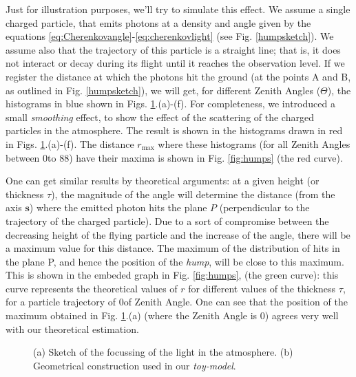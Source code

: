 Just for illustration purposes, we'll try to simulate this effect. We
assume a single charged particle, that emits \Cherenkov photons at a
density and angle given by the equations
\eqref{eq:Cherenkovangle}-\eqref{eq:cherenkovlight} (see Fig.
\ref{humpsketch}). We assume also that the trajectory of this particle
is a straight line; that is, it does not interact or decay during its
flight until it reaches the observation level. If we register the
distance at which the photons hit the ground (at the points A and B,
as outlined in Fig. \ref{humpsketch}), we will get, for different
Zenith Angles ($\Theta$), the histograms in blue shown in Figs.
\ref{fig:humpfigs}.(a)-(f). For completeness, we introduced a small
\emph{smoothing} effect, to show the effect of the scattering of the
charged particles in the atmosphere.  The result is shown in the
histograms drawn in red in Figs. \ref{fig:humpfigs}.(a)-(f). The
distance $r_{\text{max}}$ where these histograms (for all Zenith
Angles between 0\deg to 88\deg) have their maxima is shown in Fig.
\ref{fig:humps} (the red curve).

One can get similar results by theoretical arguments: at a given
height (or thickness $\tau$), the magnitude of the \Cherenkov angle will
determine the distance (from the axis $\mathbf{s}$) where the emitted
photon hits the plane $P$ (perpendicular to the trajectory of the
charged particle).  Due to a sort of compromise between the decreasing
height of the flying particle and the increase of the \Cherenkov
angle, there will be a maximum value for this distance. The maximum of
the distribution of hits in the plane P, and hence the position of the
\emph{hump}, will be close to this maximum. This is shown in the
embeded graph in Fig.  \ref{fig:humps}, (the green curve): this curve
represents the theoretical values of $r$ for different values of the
thickness $\tau$, for a particle trajectory of 0\deg of Zenith Angle.
One can see that the position of the maximum obtained in Fig.
\ref{fig:humpfigs}.(a) (where the Zenith Angle is 0\deg) agrees very
well with our theoretical estimation.

\begin{figure}[tb]
  \centering
  \mbox{}\hfill
  \hfill
  \hfill\mbox{}
  \caption{(a) Sketch of the focussing of the \Cherenkov light in 
    the atmosphere. (b) Geometrical construction used in our
    \emph{toy-model}.}
  \label{fig:humpfigs}
\end{figure}

